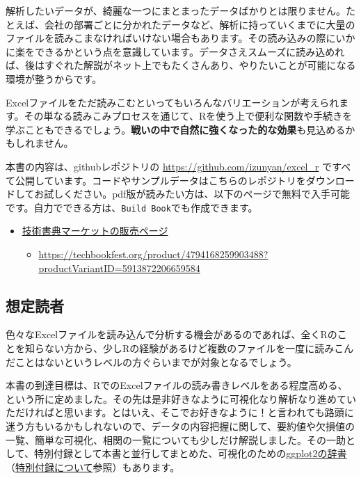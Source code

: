 \documentclass[
  xelatex,ja=standard, b5paper]{bxjsbook}
\providecommand{\tightlist}{%
  \setlength{\itemsep}{0pt}\setlength{\parskip}{0pt}}
\begin{document}
解析したいデータが、綺麗な一つにまとまったデータばかりとは限りません。たとえば、会社の部署ごとに分かれたデータなど、解析に持っていくまでに大量のファイルを読みこまなければいけない場合もあります。その読み込みの際にいかに楽をできるかという点を意識しています。データさえスムーズに読み込めれば、後はすぐれた解説がネット上でもたくさんあり、やりたいことが可能になる環境が整うからです。

Excelファイルをただ読みこむといってもいろんなバリエーションが考えられます。その単なる読みこみプロセスを通じて、Rを使う上で便利な関数や手続きを学ぶこともできるでしょう。\textbf{戦いの中で自然に強くなった的な効果}も見込めるかもしれません。

本書の内容は、githubレポジトリの \url{https://github.com/izunyan/excel_r} ですべて公開しています。コードやサンプルデータはこちらのレポジトリをダウンロードしてお試しください。pdf版が読みたい方は、以下のページで無料で入手可能です。自力でできる方は、\texttt{Build\ Book}でも作成できます。

\begin{itemize}
\tightlist
\item
  \href{https://techbookfest.org/product/4794168259903488?productVariantID=5913872206659584}{技術書典マーケットの販売ページ}

  \begin{itemize}
  \tightlist
  \item
    \url{https://techbookfest.org/product/4794168259903488?productVariantID=5913872206659584}
  \end{itemize}
\end{itemize}

\hypertarget{ux60f3ux5b9aux8aadux8005}{%
\subsection*{想定読者}\label{ux60f3ux5b9aux8aadux8005}}

色々なExcelファイルを読み込んで分析する機会があるのであれば、全くRのことを知らない方から、少しRの経験があるけど複数のファイルを一度に読みこんだことはないというレベルの方ぐらいまでが対象となるでしょう。

本書の到達目標は、RでのExcelファイルの読み書きレベルをある程度高める、という所に定めました。その先は是非好きなように可視化なり解析なり進めていただければと思います。とはいえ、そこでお好きなように！と言われても路頭に迷う方もいるかもしれないので、データの内容把握に関して、要約値や欠損値の一覧、簡単な可視化、相関の一覧についても少しだけ解説しました。その一助として、特別付録として本書と並行してまとめた、可視化のための\href{https://izunyan.github.io/practice_ggplot2/}{ggplot2の辞書}（\protect\hyperlink{huroku}{特別付録について}参照）もあります。
\end{document}
